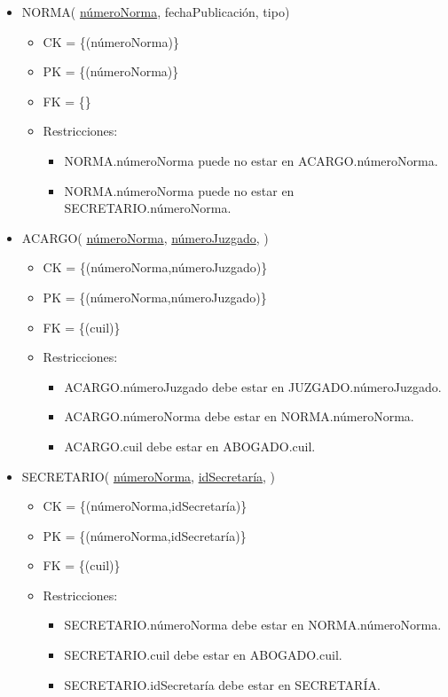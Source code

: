 \begin{itemize}
	
\item NORMA( \underline{númeroNorma}, fechaPublicación, tipo)
	\begin{itemize}
		\item CK = \{(númeroNorma)\}
		\item PK = \{(númeroNorma)\}
		\item FK = \{\}
		\item Restricciones:
			\begin{itemize}
			\item NORMA.númeroNorma puede no estar en ACARGO.númeroNorma.
			\item NORMA.númeroNorma puede no estar en SECRETARIO.númeroNorma.
			\\
			\end{itemize}
	\end{itemize}

	
\item ACARGO(  \underline{númeroNorma}, \underline{númeroJuzgado}, )
	\begin{itemize}
		\item CK = \{(númeroNorma,númeroJuzgado)\}
		\item PK = \{(númeroNorma,númeroJuzgado)\}
		\item FK = \{(cuil)\}
		\item Restricciones:
			\begin{itemize}
			\item ACARGO.númeroJuzgado debe estar en JUZGADO.númeroJuzgado.
			\item ACARGO.númeroNorma debe estar en NORMA.númeroNorma.
			\item ACARGO.cuil debe estar en ABOGADO.cuil.
			\\
			\end{itemize}
	\end{itemize}
	
	
\item SECRETARIO( \underline{númeroNorma}, \underline{idSecretaría}, )
	\begin{itemize}
		\item CK = \{(númeroNorma,idSecretaría)\}
		\item PK = \{(númeroNorma,idSecretaría)\}
		\item FK = \{(cuil)\}
		\item Restricciones:
			\begin{itemize}
			\item SECRETARIO.númeroNorma debe estar en NORMA.númeroNorma.
			\item SECRETARIO.cuil debe estar en ABOGADO.cuil.
			\item SECRETARIO.idSecretaría debe estar en SECRETARÍA.
			\\
			\end{itemize}
	\end{itemize}



\end{itemize}
